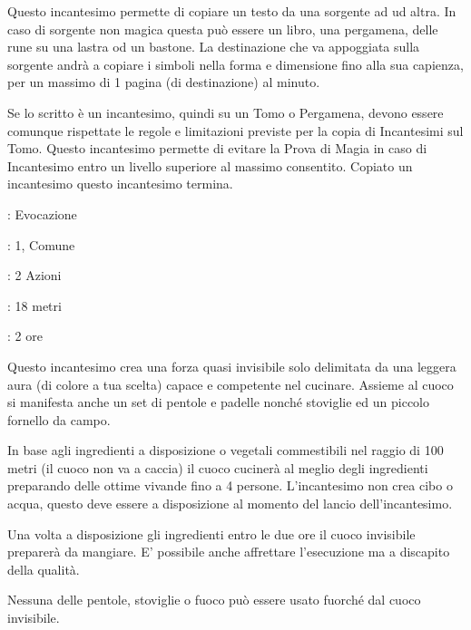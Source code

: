 \begin{multicols}{2}
Questo incantesimo permette di copiare un testo da una sorgente ad ud altra. In caso di sorgente non magica questa può essere un libro, una pergamena, delle rune su una lastra od un bastone. La destinazione che va appoggiata sulla sorgente andrà a copiare i simboli nella forma e dimensione fino alla sua capienza, per un massimo di 1 pagina (di destinazione) al minuto.

Se lo scritto è un incantesimo, quindi su un Tomo o Pergamena, devono essere comunque rispettate le regole e limitazioni previste per la copia di Incantesimi sul Tomo. Questo incantesimo permette di evitare la Prova di Magia in caso di Incantesimo entro un livello superiore al massimo consentito. Copiato un incantesimo questo incantesimo termina.

\noindent\colorbox{OBSSgold!10}{
\begin{minipage}{0.95\linewidth}
\begin{description}[noitemsep, topsep=0pt, parsep=0pt, partopsep=0pt, leftmargin=0cm, labelwidth=1.3cm]
	\item[\textbf{Lista}]: Evocazione
	\item[\textbf{Livello}]: 1, Comune
	\item[\textbf{Lancio}]: 2 Azioni
	\item[\textbf{Gittata}]: 18 metri
	\item[\textbf{Durata}]: 2 ore
\end{description}
\end{minipage}}\smallskip

Questo incantesimo crea una forza quasi invisibile solo delimitata da una leggera aura (di colore a tua scelta) capace e competente nel cucinare. Assieme al cuoco si manifesta anche un set di pentole e padelle nonché stoviglie ed un piccolo fornello da campo.

In base agli ingredienti a disposizione o vegetali commestibili nel raggio di 100 metri (il cuoco non va a caccia) il cuoco cucinerà al meglio degli ingredienti preparando delle ottime vivande fino a 4 persone. L'incantesimo non crea cibo o acqua, questo deve essere a disposizione al momento del lancio dell'incantesimo.

Una volta a disposizione gli ingredienti entro le due ore il cuoco invisibile preparerà da mangiare. E' possibile anche affrettare l'esecuzione ma a discapito della qualità.

Nessuna delle pentole, stoviglie o fuoco può essere usato fuorché dal cuoco invisibile.


\end{multicols}
